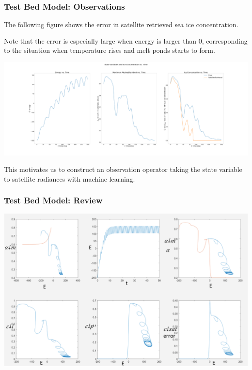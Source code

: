 \documentclass{beamer}
\begin{document}
\begin{frame}
\frametitle{Test Bed Model: Observations}
\scriptsize{
The following figure shows the error in satellite retrieved sea ice concentration.\par
Note that the error is especially large when energy is larger than $0$, corresponding to the situation when temperature rises and melt ponds starts to form.
}
\begin{center}
\includegraphics[width=\linewidth]{Figures/StateAndConcentration.png}
\end{center}
\small{
This motivates us to construct an observation operator taking the state variable to satellite radiances with machine learning.
}
\end{frame}

\begin{frame}
\frametitle{Test Bed Model: Review}

\begin{center}
\includegraphics[width=0.9\linewidth]{Figures/MatlabPlot.png}
\end{center}

\end{frame}
\end{document}
